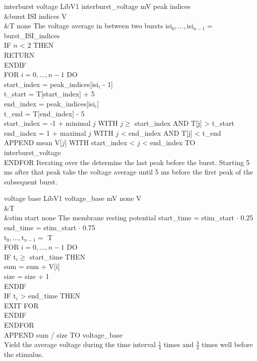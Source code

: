 \begin{efeature}
  {interburst voltage}
  {LibV1}
  {interburst\_voltage}
  {mV}
  {peak indices\\&burst ISI indices}
  {V\\&T}
  {none}
  {The voltage average in between two bursts}
  {
  isi$_0, \ldots, $isi$_{n-1} =$ burst\_ISI\_indices \\
  IF $n$ < 2 THEN \+ \\
    RETURN \- \\
  ENDIF \\
  FOR $i = 0, \dots, n - 1$ DO \+ \\
    start\_index = peak\_indices[isi$_i$ - 1] \\
    t\_start = T[start\_index] + 5 \\
    end\_index = peak\_indices[isi$_i$] \\
    t\_end = T[end\_index] - 5 \\
    start\_index = -1 + minimal $j$ WITH $j \ge$ start\_index AND T[j] > t\_start \\
    end\_index = 1 + maximal $j$ WITH $j$ < end\_index AND T[j] < t\_end \\
    APPEND mean V[$j$] WITH start\_index < $j$ < end\_index TO interburst\_voltage \- \\
  ENDFOR
  }
  Iterating over the  determine the last peak before the burst.
  Starting 5 ms after that peak take the voltage average until 5 ms before the first peak of the subsequent burst.
  
\end{efeature}

\begin{efeature}
  {voltage base}
  {LibV1}
  {voltage\_base}
  {mV}
  {none}
  {V\\&T\\&stim start}
  {none}
  {The membrane resting potential}
  {
  start\_time = stim\_start $\cdot$ 0.25 \\
  end\_time = stim\_start $\cdot$ 0.75 \\
  t$_0, \ldots, $t$_{n-1} =$ T \\ 
  FOR $i = 0, \dots, n - 1$ DO \+ \\
     IF t$_i \ge$ start\_time THEN \+ \\
      sum = sum + V[i] \\
      size = size + 1 \- \\
    ENDIF \\
    IF t$_i$ > end\_time THEN \+ \\
      EXIT FOR \- \\
    ENDIF \- \\
  ENDFOR \\
  APPEND sum / size TO voltage\_base \\
  }
  Yield the average voltage during the time interval $\frac{1}{4}$ times  and $\frac{3}{4}$ times  well before the stimulus.
  
\end{efeature}

